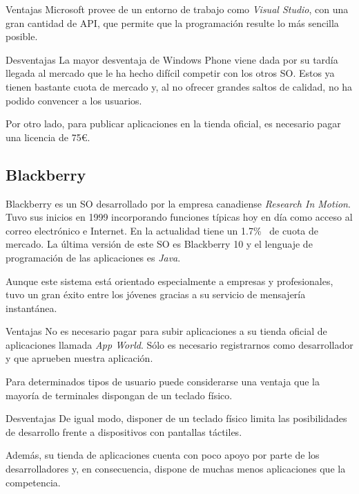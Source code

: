 \begin{definitionlist}
  \item[Ventajas] Microsoft provee de un entorno de trabajo como \emph{Visual Studio}, con una gran
    cantidad de \acf{API}, que permite que la programación resulte lo más sencilla posible.

  \item[Desventajas] La mayor desventaja de Windows Phone viene dada por su tardía llegada al
    mercado que le ha hecho difícil competir con los otros \acs{SO}. Estos ya tienen bastante cuota
    de mercado y, al no ofrecer grandes saltos de calidad, no ha podido convencer a los usuarios.

    Por otro lado, para publicar aplicaciones en la tienda oficial, es necesario pagar una licencia
    de 75\euro{}.

\end{definitionlist}

\subsection{Blackberry}

Blackberry es un \acs{SO} desarrollado por la empresa canadiense \emph{Research In Motion}. Tuvo sus
inicios en 1999 incorporando funciones típicas hoy en día como acceso al correo electrónico e
Internet. En la actualidad tiene un 1.7\%~\cite{Llamas13} de cuota de mercado. La última versión de
este \acs{SO} es Blackberry 10 y el lenguaje de programación de las aplicaciones es \emph{Java}.

Aunque este sistema está orientado especialmente a empresas y profesionales, tuvo un gran éxito
entre los jóvenes gracias a su servicio de mensajería instantánea.

\begin{definitionlist}
  \item[Ventajas] No es necesario pagar para subir aplicaciones a su tienda oficial de aplicaciones
    llamada \emph{App World}. Sólo es necesario registrarnos como desarrollador y que aprueben
    nuestra aplicación.

    Para determinados tipos de usuario puede considerarse una ventaja que la mayoría de terminales
    dispongan de un teclado físico.

  \item[Desventajas] De igual modo, disponer de un teclado físico limita las posibilidades de
    desarrollo frente a dispositivos con pantallas táctiles.

    Además, su tienda de aplicaciones cuenta con poco apoyo por parte de los desarrolladores y, en
    consecuencia, dispone de muchas menos aplicaciones que la competencia.

\end{definitionlist}

